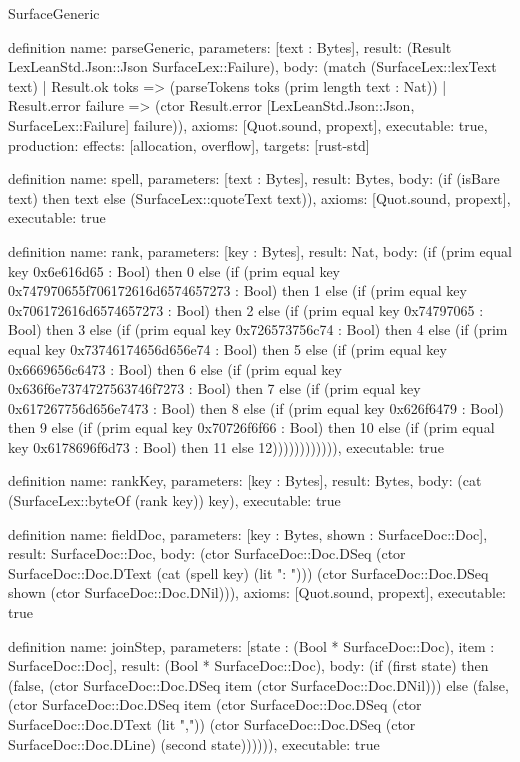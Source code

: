 \begin{lexlean}{SurfaceGeneric}
\begin{semanticmodule}
definition{
  name: parseGeneric,
  parameters: [text : Bytes],
  result: (Result LexLeanStd.Json::Json SurfaceLex::Failure),
  body: (match (SurfaceLex::lexText text)
    | Result.ok toks => (parseTokens toks (prim length text : Nat))
    | Result.error failure => (ctor Result.error [LexLeanStd.Json::Json, SurfaceLex::Failure] failure)),
  axioms: [Quot.sound, propext],
  executable: true,
  production: {effects: [allocation, overflow], targets: [rust-std]}
}

definition{
  name: spell,
  parameters: [text : Bytes],
  result: Bytes,
  body: (if (isBare text) then text else (SurfaceLex::quoteText text)),
  axioms: [Quot.sound, propext],
  executable: true
}

definition{
  name: rank,
  parameters: [key : Bytes],
  result: Nat,
  body: (if (prim equal key 0x6e616d65 : Bool) then 0 else (if (prim equal key 0x747970655f706172616d6574657273 : Bool) then 1 else (if (prim equal key 0x706172616d6574657273 : Bool) then 2 else (if (prim equal key 0x74797065 : Bool) then 3 else (if (prim equal key 0x726573756c74 : Bool) then 4 else (if (prim equal key 0x73746174656d656e74 : Bool) then 5 else (if (prim equal key 0x6669656c6473 : Bool) then 6 else (if (prim equal key 0x636f6e7374727563746f7273 : Bool) then 7 else (if (prim equal key 0x617267756d656e7473 : Bool) then 8 else (if (prim equal key 0x626f6479 : Bool) then 9 else (if (prim equal key 0x70726f6f66 : Bool) then 10 else (if (prim equal key 0x6178696f6d73 : Bool) then 11 else 12)))))))))))),
  executable: true
}

definition{
  name: rankKey,
  parameters: [key : Bytes],
  result: Bytes,
  body: (cat (SurfaceLex::byteOf (rank key)) key),
  executable: true
}

definition{
  name: fieldDoc,
  parameters: [key : Bytes, shown : SurfaceDoc::Doc],
  result: SurfaceDoc::Doc,
  body: (ctor SurfaceDoc::Doc.DSeq (ctor SurfaceDoc::Doc.DText (cat (spell key) (lit ": "))) (ctor SurfaceDoc::Doc.DSeq shown (ctor SurfaceDoc::Doc.DNil))),
  axioms: [Quot.sound, propext],
  executable: true
}

definition{
  name: joinStep,
  parameters: [state : (Bool * SurfaceDoc::Doc), item : SurfaceDoc::Doc],
  result: (Bool * SurfaceDoc::Doc),
  body: (if (first state) then (false, (ctor SurfaceDoc::Doc.DSeq item (ctor SurfaceDoc::Doc.DNil))) else (false, (ctor SurfaceDoc::Doc.DSeq item (ctor SurfaceDoc::Doc.DSeq (ctor SurfaceDoc::Doc.DText (lit ",")) (ctor SurfaceDoc::Doc.DSeq (ctor SurfaceDoc::Doc.DLine) (second state)))))),
  executable: true
}


\end{semanticmodule}
\end{lexlean}
